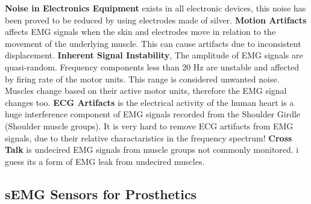 \documentclass[../main.tex]{subfiles}
\begin{document}
\textbf{Noise in Electronics Equipment} exists in all electronic devices, this noise has been proved to be reduced by using electrodes made of silver.
\textbf{Motion Artifacts} affects EMG signals when the skin and electrodes move in relation to the movement of the underlying muscle.
This can cause artifacts due to inconsistent displacement.
\textbf{Inherent Signal Instability}, The amplitude of EMG signals are quasi-random. Frequency components less than 20 Hz are unstable and affected by firing rate of the motor units. This range is considered unwanted noise. Muscles change based on their active motor units, therefore the EMG signal changes too.
\textbf{ECG Artifacts} is the electrical activity of the human heart is a huge interference component of EMG signals recorded from the Shoulder Girdle (Shoulder muscle groups).
It is very hard to remove ECG artifacts from EMG signals, due to their relative charactaristics in the frequency spectrum!
\textbf{Cross Talk} is undecired EMG signals from muscle groups not commonly monitored. i guess its a form of EMG leak from undecired muscles.


\subsection{sEMG Sensors for Prosthetics}
\end{document}
